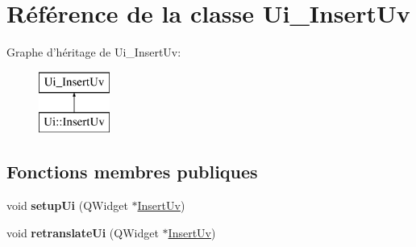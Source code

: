 \hypertarget{class_ui___insert_uv}{\section{Référence de la classe Ui\+\_\+\+Insert\+Uv}
\label{class_ui___insert_uv}
}
Graphe d'héritage de Ui\+\_\+\+Insert\+Uv\+:\begin{figure}[H]
\begin{center}
\leavevmode
\includegraphics[height=2.000000cm]{class_ui___insert_uv}
\end{center}
\end{figure}
\subsection*{Fonctions membres publiques}
\begin{DoxyCompactItemize}
\item 
\hypertarget{class_ui___insert_uv_a08460e0d2fbbd5d2a67913e3c2fbc1c9}{void {\bfseries setup\+Ui} (Q\+Widget $\ast$\hyperlink{class_insert_uv}{Insert\+Uv})}\label{class_ui___insert_uv_a08460e0d2fbbd5d2a67913e3c2fbc1c9}

\item 
\hypertarget{class_ui___insert_uv_a1c13bea0dac65e742cc743e0e7eeb698}{void {\bfseries retranslate\+Ui} (Q\+Widget $\ast$\hyperlink{class_insert_uv}{Insert\+Uv})}\label{class_ui___insert_uv_a1c13bea0dac65e742cc743e0e7eeb698}

\end{DoxyCompactItemize}
